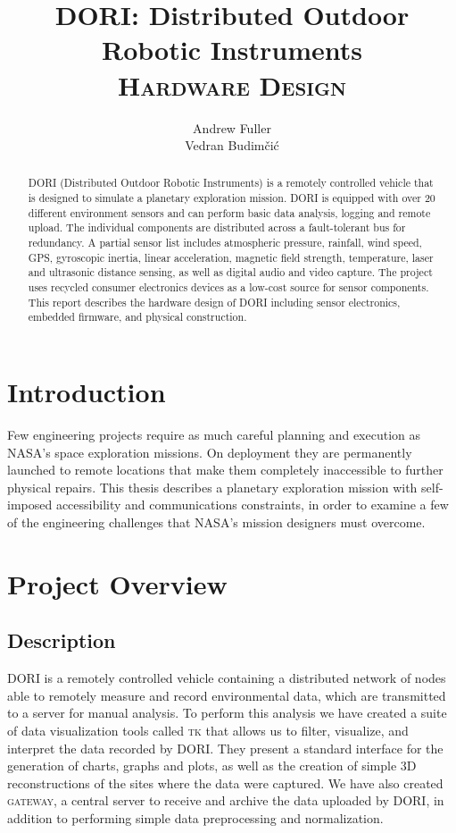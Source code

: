 \documentclass[12pt]{article}
\title{\textbf{DORI: Distributed Outdoor \\ Robotic Instruments \\ \large  \textsc{Hardware Design}}}
\author{Andrew Fuller \\ Vedran Budimčić}
\begin{document}
\maketitle
\vspace{15mm}
\begin{abstract}
\textsc{DORI} (Distributed Outdoor Robotic Instruments) is a remotely controlled vehicle that is designed to simulate a planetary exploration mission. \textsc{DORI} is equipped with over 20 different environment sensors and can perform basic data analysis, logging and remote upload. The individual components are distributed across a fault-tolerant bus for redundancy. A partial sensor list includes atmospheric pressure, rainfall, wind speed, GPS, gyroscopic inertia, linear acceleration, magnetic field strength, temperature, laser and ultrasonic distance sensing, as well as digital audio and video capture. The project uses recycled consumer electronics devices as a low-cost source for sensor components. This report describes the hardware design of DORI including sensor electronics, embedded firmware, and physical construction.
\end{abstract}
\newpage
\tableofcontents
\newpage
{}


\section{Introduction}
Few engineering projects require as much careful planning and execution as NASA's space exploration missions. On deployment they are permanently launched to remote locations that make them completely inaccessible to further physical repairs. This thesis describes a planetary exploration mission with self-imposed accessibility and communications constraints, in order to examine a few of the engineering challenges that NASA's mission designers must overcome.



\section{Project Overview}
\subsection{Description}
\textsc{DORI} is a remotely controlled vehicle containing a distributed network of nodes able to remotely measure and record environmental data, which are transmitted to a server for manual analysis. To perform this analysis we have created a suite of data visualization tools called \textsc{tk} that allows us to filter, visualize, and interpret the data recorded by \textsc{DORI}. They present a standard interface for the generation of charts, graphs and plots, as well as the creation of simple 3D reconstructions of the sites where the data were captured. We have also created \textsc{gateway}, a central server to receive and archive the data uploaded by \textsc{DORI}, in addition to performing simple data preprocessing and normalization.
\end{document}
